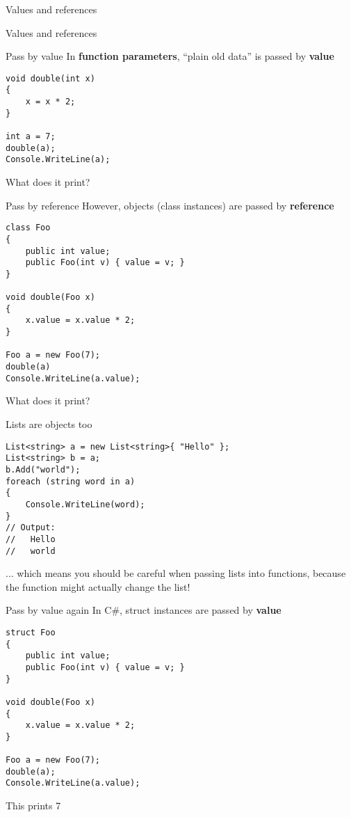 \begin{frame}{Values and references}
	\socrative
	
\end{frame}

\begin{frame}{Values and references}
	\socrative
	
\end{frame}

\begin{frame}[fragile]{Pass by value}
	\socrative
	In \textbf{function parameters},
	``plain old data'' is passed by \textbf{value}
	\pause
	\begin{lstlisting}
void double(int x)
{
	x = x * 2;
}

int a = 7;
double(a);
Console.WriteLine(a);
	\end{lstlisting}
	\pause
	What does it print?
\end{frame}

\begin{frame}[fragile]{Pass by reference}
	\socrative
	However, objects (class instances) are passed by \textbf{reference}
	\pause
	\begin{lstlisting}
class Foo
{
	public int value;
	public Foo(int v) { value = v; }
}

void double(Foo x)
{
    x.value = x.value * 2;
}

Foo a = new Foo(7);
double(a)
Console.WriteLine(a.value);
	\end{lstlisting}
	\pause
	What does it print?
\end{frame}

\begin{frame}[fragile]{Lists are objects too}
	\pause
	\begin{lstlisting}
List<string> a = new List<string>{ "Hello" };
List<string> b = a;
b.Add("world");
foreach (string word in a)
{
	Console.WriteLine(word);
}
// Output:
//   Hello
//   world
\end{lstlisting}
	\pause
	... which means you should be careful when passing lists into functions,
	because the function might actually change the list!
\end{frame}

\begin{frame}[fragile]{Pass by value again}
	In C\#, struct instances are passed by \textbf{value}
	\pause
	\begin{lstlisting}
struct Foo
{
	public int value;
	public Foo(int v) { value = v; }
}

void double(Foo x)
{
    x.value = x.value * 2;
}

Foo a = new Foo(7);
double(a);
Console.WriteLine(a.value);
	\end{lstlisting}
	\pause
	This prints 7
\end{frame}


